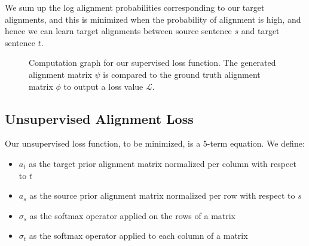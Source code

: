 \documentclass[twoside,twocolumn]{article}
\begin{document}
We sum up the log alignment probabilities corresponding to our
target alignments, and this is minimized when the probability of alignment
is high, and hence we can learn target alignments between source
sentence $s$ and target sentence $t$.

\begin{figure}
  \centering
  \caption{Computation graph for our supervised loss function.
    The generated alignment matrix $\psi$ is compared to the ground
    truth alignment matrix $\phi$ to output a loss value $\mathcal{L}$.}
  \label{fig:supervised_loss}
\end{figure}

\subsection{Unsupervised Alignment Loss}


Our unsupervised loss function, to be minimized, is a 5-term equation.
We define:
\begin{itemize}[label={}]
  \item $a_t$ as the target prior alignment matrix normalized per column with respect to $t$\\ %
  \item $a_s$ as the source prior alignment matrix normalized per row with respect to $s$\\ %
  \item $\sigma_s$ as the softmax operator applied on the rows of a matrix\\
  \item $\sigma_t$ as the softmax operator applied to each column of a matrix
\end{itemize}
\end{document}
